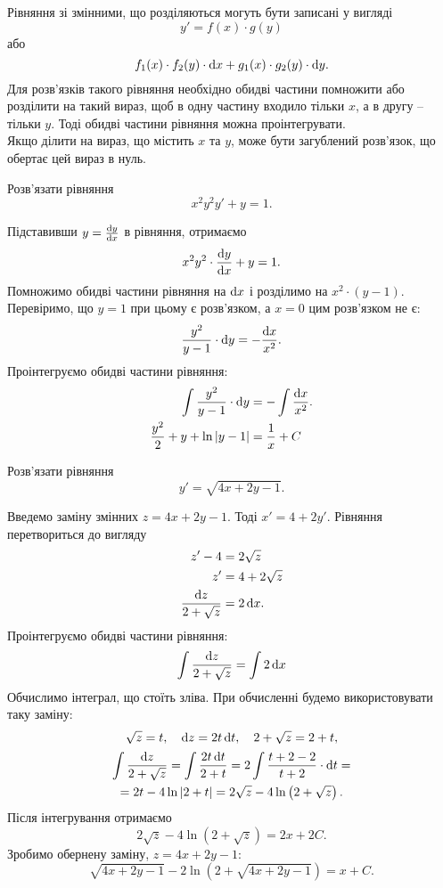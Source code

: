 Рівняння зі змінними, що розділяються могуть бути записані у вигляді \[y' = f(x) \cdot g(y)\] або \[f_1(x) \cdot f_2(y) \cdot \mathop{}\!\mathrm{d} x + g_1(x) \cdot g_2(y) \cdot \mathop{}\!\mathrm{d} y.\] Для розв’язків такого рівняння необхідно обидві частини помножити або розділити на такий вираз, щоб в одну частину входило тільки $x$, а в другу -- тільки $y$. Тоді обидві частини рівняння можна проінтегрувати. \\

Якщо ділити на вираз, що містить $x$ та $y$, може бути загублений розв’язок, що обертає цей вираз в нуль.

\begin{example}
	Розв’язати рівняння \[x^2 y^2 y' + y = 1.\]
\end{example}

\begin{solution}
	Підставивши $y = \frac{\mathop{}\!\mathrm{d} y}{\mathop{}\!\mathrm{d} x}$ в рівняння, отримаємо \[ x^2 y^2 \cdot \frac{\mathop{}\!\mathrm{d} y}{\mathop{}\!\mathrm{d} x} + y = 1.\] Помножимо обидві частини рівняння на $\mathop{}\!\mathrm{d} x$ і розділимо на $x^2 \cdot (y - 1)$. Перевіримо, що $y = 1$ при цьому є розв’язком, а $x = 0$ цим розв’язком не є: \[ \frac{y^2}{y - 1} \cdot \mathop{}\!\mathrm{d} y = - \frac{\mathop{}\!\mathrm{d} x}{x^2}. \] Проінтегруємо обидві частини рівняння:
	\begin{align*}
		\int \frac{y^2}{y - 1} \cdot \mathop{}\!\mathrm{d} y &= - \int \frac{\mathop{}\!\mathrm{d} x}{x^2}. \\
		\frac{y^2}{2} + y + \ln |y - 1| &= \frac{1}{x} + C
	\end{align*}
\end{solution}

\begin{example}
	Розв’язати рівняння \[ y' = \sqrt{4x + 2y - 1}.\] 
\end{example}

\begin{solution}
	Введемо заміну змінних $z = 4 x + 2 y - 1$. Тоді $x' = 4 + 2 y'$. Рівняння перетвориться до вигляду \begin{align*} z' - 4 &= 2 \sqrt{z} \\ z' &= 4 + 2 \sqrt{z} \\ \frac{\mathop{}\!\mathrm{d} z}{2 + \sqrt{z}} &= 2 \mathop{}\!\mathrm{d} x.\end{align*} Проінтегруємо обидві частини рівняння: \[ \int \frac{\mathop{}\!\mathrm{d} z}{2 + \sqrt{z}} = \int 2 \mathop{}\!\mathrm{d} x \] Обчислимо інтеграл, що стоїть зліва. При обчисленні будемо використовувати таку заміну: \[ \sqrt{z} = t, \quad \mathop{}\!\mathrm{d} z = 2 t \mathop{}\!\mathrm{d} t, \quad 2 + \sqrt{z} = 2 + t, \]
	\begin{multline*}
		\int \frac{\mathop{}\!\mathrm{d} z}{2 + \sqrt{z}} = \int \frac{2 t \mathop{}\!\mathrm{d} t}{2 + t} = 2 \int \frac{t + 2 - 2}{t + 2} \cdot \mathop{}\!\mathrm{d} t = \\
		= 2 t - 4 \ln |2 + t| = 2 \sqrt{z} - 4 \ln \left(2 + \sqrt{z}\right).
	\end{multline*}
	Після інтегрування отримаємо \[2 \sqrt{z} - 4 \ln \left(2 + \sqrt{z}\right) = 2 x + 2 C.\] Зробимо обернену заміну, $z = 4x + 2y - 1$: \[ \sqrt{4x + 2y - 1} - 2 \ln \left(2 + \sqrt{4x + 2y - 1}\right) = x + C.\]
\end{solution}

